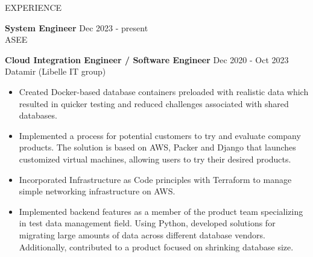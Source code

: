 \documentclass{resume} %
\begin{document}
\begin{rSection}{EXPERIENCE}

\textbf{System Engineer} \hfill Dec 2023 - present\\
ASEE \hfill

\textbf{Cloud Integration Engineer / Software Engineer} \hfill Dec 2020 - Oct 2023\\
Datamir (Libelle IT group) \hfill
 \begin{itemize}
    \itemsep -3pt {} 
     \item Created Docker-based database containers preloaded with realistic data which resulted in quicker testing and reduced challenges associated with shared databases.
    \item Implemented a process for potential customers to try and evaluate company products. The solution is based on AWS, Packer and Django that launches customized virtual machines, allowing users to try their desired products.   
    \item Incorporated Infrastructure as Code principles with Terraform to manage simple networking infrastructure on AWS.
    \item Implemented backend features as a member of the product team specializing in test data management field. Using Python, developed solutions for migrating large amounts of data across different database vendors. Additionally, contributed to a product focused on shrinking database size.
 \end{itemize}
 
\end{rSection} 

\end{document}

